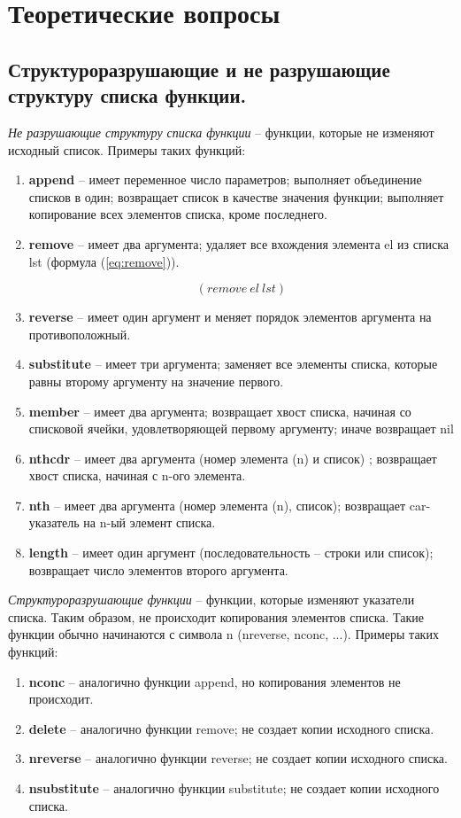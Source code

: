 \chapter{Теоретические вопросы}
\section{Структуроразрушающие и не разрушающие структуру списка функции.}
\textit{Не разрушающие структуру списка функции} -- функции, которые не изменяют исходный список. Примеры таких функций:
\begin{enumerate}
	\item \textbf{append} -- имеет переменное число параметров; выполняет объединение списков в один; возвращает список в качестве значения функции; выполняет копирование всех элементов списка, кроме последнего.
	\item \textbf{remove} -- имеет два аргумента; удаляет все вхождения элемента el из списка lst (формула (\ref{eq:remove})).
	
	\begin{equation}
		\label{eq:remove}
		(remove\ el\ lst)
	\end{equation}

	\item{\textbf{reverse}} -- имеет один аргумент и меняет порядок элементов аргумента на противоположный.
	\item{\textbf{substitute}} -- имеет три аргумента; заменяет все элементы списка, которые равны второму аргументу на значение первого.
	\item{\textbf{member}} -- имеет два аргумента; возвращает хвост списка, начиная со списковой ячейки, удовлетворяющей первому аргументу; иначе возвращает nil
	\item{\textbf{nthcdr}} -- имеет два аргумента (номер элемента (n) и список) ; возвращает хвост списка, начиная с n-ого элемента.
	\item{\textbf{nth}} -- имеет два аргумента (номер элемента (n), список); возвращает car-указатель на n-ый элемент списка.
	\item{\textbf{length}} -- имеет один аргумент (последовательность -- строки или список); возвращает число элементов второго аргумента.
\end{enumerate}

\textit{Структуроразрушающие функции} -- функции, которые изменяют указатели списка. Таким образом, не происходит копирования элементов списка. Такие функции обычно начинаются с символа n (nreverse, nconc, ...). Примеры таких функций:
\begin{enumerate}
	\item \textbf{nconc} -- аналогично функции append, но копирования элементов не происходит.
	\item \textbf{delete} -- аналогично функции remove; не создает копии исходного списка.
	\item \textbf{nreverse} -- аналогично функции reverse; не создает копии исходного списка.
	\item \textbf{nsubstitute} -- аналогично функции substitute; не создает копии исходного списка.
\end{enumerate}



